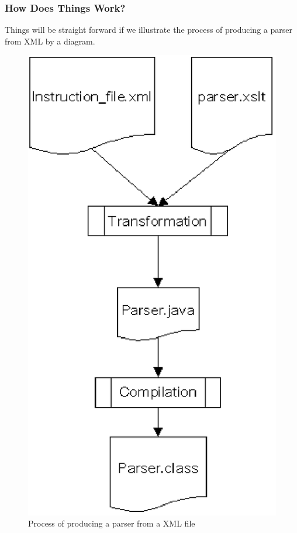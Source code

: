 \subsubsection{How Does Things Work?} \label{XSLT generation.how things work}

Things will be straight forward if we illustrate the process of
producing a parser from XML by a diagram.

\begin{figure}[h]

\begin{center}
\includegraphics[scale=0.8]{parsergeneration.eps}
\end{center}

\caption{Process of producing a parser from a XML file}

\end{figure}

